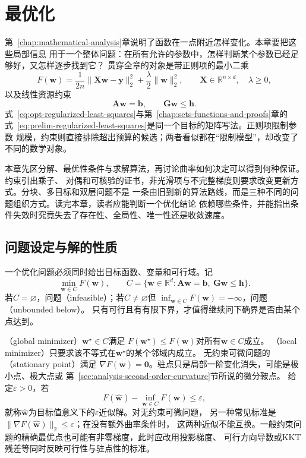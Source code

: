 \chapter{最优化}
\label{chap:optimization}

第~\ref{chap:mathematical-analysis}章说明了函数在一点附近怎样变化。本章要把这些局部信息
用于一个整体问题：在所有允许的参数中，怎样判断某个参数已经足够好，又怎样逐步找到它？
贯穿全章的对象是带正则项的最小二乘
\begin{equation}
  F(\bm{w})
  =
  \frac{1}{2n}\lVert \bm{X}\bm{w}-\bm{y}\rVert_2^2
  +\frac{\lambda}{2}\lVert\bm{w}\rVert_2^2,
  \qquad
  \bm{X}\in\mathbb{R}^{n\times d},\quad \lambda\geq 0,
  \label{eq:opt-regularized-least-squares}
\end{equation}
以及线性资源约束
\begin{equation}
  \bm{A}\bm{w}=\bm{b},\qquad
  \bm{G}\bm{w}\leq\bm{h}.
  \label{eq:opt-linear-resource-constraints}
\end{equation}
式~\eqref{eq:opt-regularized-least-squares}与第~\ref{chap:sets-functions-and-proofs}章的
式~\eqref{eq:prelim-regularized-least-squares}是同一个目标的矩阵写法。正则项限制参数
规模，约束则直接排除超出预算的候选；两者看似都在“限制模型”，却改变了不同的数学对象。

本章先区分解、最优性条件与求解算法，再讨论曲率如何决定可以得到何种保证。约束引出乘子、
对偶和可核验的证书，非光滑项与不完整梯度则要求改变更新方式。分块、多目标和双层问题不是
一条由旧到新的算法路线，而是三种不同的问题组织方式。读完本章，读者应能判断一个优化结论
依赖哪些条件，并能指出条件失效时究竟失去了存在性、全局性、唯一性还是收敛速度。

\section{问题设定与解的性质}
\label{sec:opt-problem-and-solutions}

一个优化问题必须同时给出目标函数、变量和可行域。记
\[
  \min_{\bm{w}\in C}F(\bm{w}),\qquad
  C=\{\bm{w}\in\mathbb{R}^d:
  \bm{A}\bm{w}=\bm{b},\ \bm{G}\bm{w}\leq\bm{h}\}.
\]
若$C=\varnothing$，问题（infeasible）；若$C\neq\varnothing$但
$\inf_{\bm{w}\in C}F(\bm{w})=-\infty$，问题（unbounded below）。
只有可行且有有限下界，才值得继续问下确界是否由某个点达到。

（global minimizer）$\bm{w}^{\star}\in C$满足
$F(\bm{w}^{\star})\leq F(\bm{w})$对所有$\bm{w}\in C$成立。
（local minimizer）只要求该不等式在$\bm{w}^{\star}$的某个邻域内成立。
无约束可微问题的（stationary point）满足
$\nabla F(\bm{w})=\bm{0}$。驻点只是局部一阶变化消失，可能是极小点、极大点或
第~\ref{sec:analysis-second-order-curvature}节所说的微分鞍点。
给定$\varepsilon>0$，若
\[
  F(\widehat{\bm{w}})-\inf_{\bm{w}\in C}F(\bm{w})\leq\varepsilon,
\]
就称$\widehat{\bm{w}}$为目标值意义下的$\varepsilon$近似解。对无约束可微问题，
另一种常见标准是
$\lVert\nabla F(\widehat{\bm{w}})\rVert_2\leq\varepsilon$；在没有额外曲率条件时，
这两种近似不能互换。一般约束问题的精确最优点也可能有非零梯度，此时应改用投影梯度、
可行方向导数或KKT残差等同时反映可行性与驻点性的标准。

